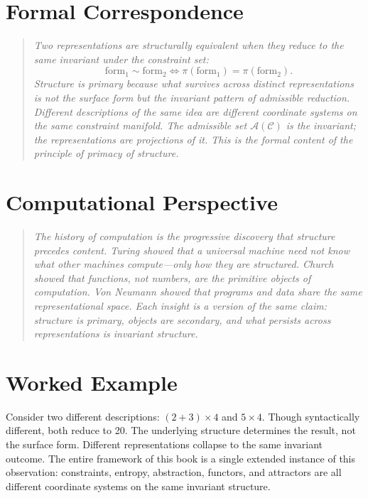 \documentclass[11pt]{book}
\theoremstyle{plain}
\theoremstyle{definition}
\theoremstyle{remark}
\newcommand{\C}{\mathcal{C}}
\newcommand{\A}{\mathcal{A}}
\newenvironment{formalcorrespondence}
  {\begin{quote}\small\itshape}
  {\end{quote}}
\newenvironment{computationalaside}
  {\begin{quote}\small\itshape}
  {\end{quote}}
\begin{document}
\section*{Formal Correspondence}
\begin{formalcorrespondence}
Two representations are structurally equivalent when they reduce to the
same invariant under the constraint set:
\[
  \mathrm{form}_1 \sim \mathrm{form}_2 \iff \pi(\mathrm{form}_1)
  = \pi(\mathrm{form}_2).
\]
Structure is primary because what survives across distinct representations
is not the surface form but the invariant pattern of admissible reduction.
Different descriptions of the same idea are different coordinate systems
on the same constraint manifold. The admissible set $\A(\C)$ is the
invariant; the representations are projections of it. This is the formal
content of the principle of primacy of structure.
\end{formalcorrespondence}

\section*{Computational Perspective}
\begin{computationalaside}
The history of computation is the progressive discovery that structure
precedes content. Turing showed that a universal machine need not know
what other machines compute---only how they are structured. Church showed
that functions, not numbers, are the primitive objects of computation.
Von Neumann showed that programs and data share the same representational
space. Each insight is a version of the same claim: structure is primary,
objects are secondary, and what persists across representations is
invariant structure.
\end{computationalaside}

\section*{Worked Example}
Consider two different descriptions: $(2 + 3) \times 4$ and $5 \times 4$.
Though syntactically different, both reduce to 20. The underlying
structure determines the result, not the surface form. Different
representations collapse to the same invariant outcome. The entire
framework of this book is a single extended instance of this observation:
constraints, entropy, abstraction, functors, and attractors are all
different coordinate systems on the same invariant structure.
\end{document}
